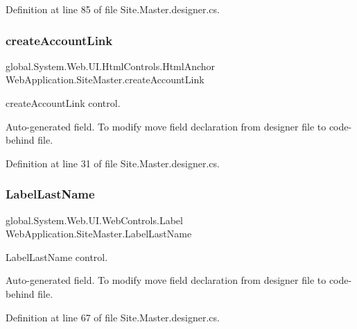 Definition at line 85 of file Site.\+Master.\+designer.\+cs.

\mbox{\label{classWebApplication_1_1SiteMaster_a085178ad4ea764721387a99e79a79c1d}} 
\subsubsection{\texorpdfstring{createAccountLink}{createAccountLink}}
{\footnotesize\ttfamily global.\+System.\+Web.\+U\+I.\+Html\+Controls.\+Html\+Anchor Web\+Application.\+Site\+Master.\+create\+Account\+Link\hspace{0.3cm}{\ttfamily [protected]}}



create\+Account\+Link control. 

Auto-\/generated field. To modify move field declaration from designer file to code-\/behind file. 

Definition at line 31 of file Site.\+Master.\+designer.\+cs.

\mbox{\label{classWebApplication_1_1SiteMaster_afeb8f86976a4f7ac34b672b37d1ee0c7}} 
\subsubsection{\texorpdfstring{LabelLastName}{LabelLastName}}
{\footnotesize\ttfamily global.\+System.\+Web.\+U\+I.\+Web\+Controls.\+Label Web\+Application.\+Site\+Master.\+Label\+Last\+Name\hspace{0.3cm}{\ttfamily [protected]}}



Label\+Last\+Name control. 

Auto-\/generated field. To modify move field declaration from designer file to code-\/behind file. 

Definition at line 67 of file Site.\+Master.\+designer.\+cs.

\mbox{\label{classWebApplication_1_1SiteMaster_a594c1bf520b5ada76310e50df143e91b}} 
